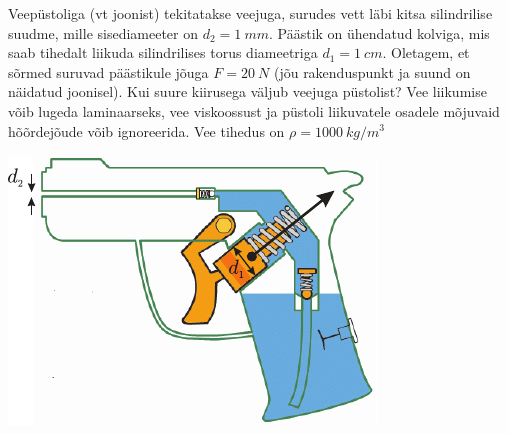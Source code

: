 \documentclass[10pt]{article}
\begin{document}
{%

Veepüstoliga (vt joonist) tekitatakse veejuga, surudes vett läbi kitsa silindrilise suudme, mille sisediameeter on $d_2 = \SI{1}{mm}$. Päästik on ühendatud kolviga, mis saab tihedalt liikuda silindrilises torus diameetriga $d_1 = \SI{1}{cm}$. Oletagem, et sõrmed suruvad päästikule jõuga $F = \SI{20}{N}$ (jõu rakenduspunkt ja suund on näidatud joonisel). Kui suure kiirusega väljub veejuga püstolist? Vee liikumise võib lugeda laminaarseks, vee viskoossust ja püstoli liikuvatele osadele mõjuvaid hõõrdejõude võib ignoreerida. Vee tihedus on $\rho = \SI{1000}{kg/m^3}$

\begin{center}
	\includegraphics[width=0.6\linewidth]{2006-v3g-04-yl}
\end{center}
\probend
\bigskip


}
\end{document}
